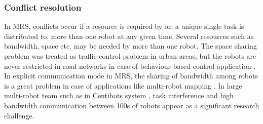 \subsubsection*{Conflict resolution}
In MRS, conflicts occur if a resource is required by or, a unique single task is distributed to, more than one robot at any given time. Several resources such as bandwidth, space etc. may be needed by more than one robot. The space sharing problem was treated as traffic control problem in urban areas, but the robots are never restricted in road networks in case of behaviour-based control application \cite{Cao+1997}. In explicit communication mode in MRS, the sharing of bandwidth among robots is a great problem in case of applications like multi-robot mapping \cite{Konolige+2003}. In large multi-robot team such as in Centibots system \cite{Ortiz+2005}, task interference and high bandwidth communication between 100s of robots appear as a significant research challenge.

